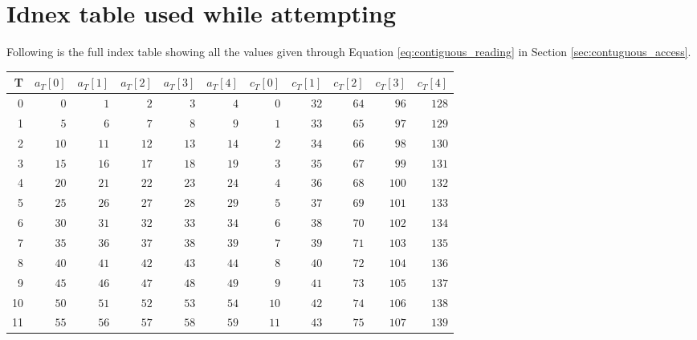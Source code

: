 \section{Idnex table used while attempting }
Following is the full index table showing all the values given through Equation \ref{eq:contiguous_reading} in Section \ref{sec:contuguous_access}.

\begin{table}[H]
    \small
    \begin{tabular}{r|rrrrr|rrrrr}
        T  & $a_T[0]$ & $a_T[1]$ & $a_T[2]$ & $a_T[3]$ & $a_T[4]$ & $c_T[0]$ & $c_T[1]$ & $c_T[2]$ & $c_T[3]$ & $c_T[4]$ \\
        \hline

        0  & $0$      & $1$      & $2$      & $3$      & $4$      & $0$      & $32$     & $64$     & $96$     & $128$    \\
        1  & $5$      & $6$      & $7$      & $8$      & $9$      & $1$      & $33$     & $65$     & $97$     & $129$    \\
        2  & $10$     & $11$     & $12$     & $13$     & $14$     & $2$      & $34$     & $66$     & $98$     & $130$    \\
        3  & $15$     & $16$     & $17$     & $18$     & $19$     & $3$      & $35$     & $67$     & $99$     & $131$    \\
        4  & $20$     & $21$     & $22$     & $23$     & $24$     & $4$      & $36$     & $68$     & $100$    & $132$    \\
        5  & $25$     & $26$     & $27$     & $28$     & $29$     & $5$      & $37$     & $69$     & $101$    & $133$    \\
        6  & $30$     & $31$     & $32$     & $33$     & $34$     & $6$      & $38$     & $70$     & $102$    & $134$    \\
        7  & $35$     & $36$     & $37$     & $38$     & $39$     & $7$      & $39$     & $71$     & $103$    & $135$    \\
        8  & $40$     & $41$     & $42$     & $43$     & $44$     & $8$      & $40$     & $72$     & $104$    & $136$    \\
        9  & $45$     & $46$     & $47$     & $48$     & $49$     & $9$      & $41$     & $73$     & $105$    & $137$    \\
        10 & $50$     & $51$     & $52$     & $53$     & $54$     & $10$     & $42$     & $74$     & $106$    & $138$    \\
        11 & $55$     & $56$     & $57$     & $58$     & $59$     & $11$     & $43$     & $75$     & $107$    & $139$    \\

\end{tabular}
\end{table}
